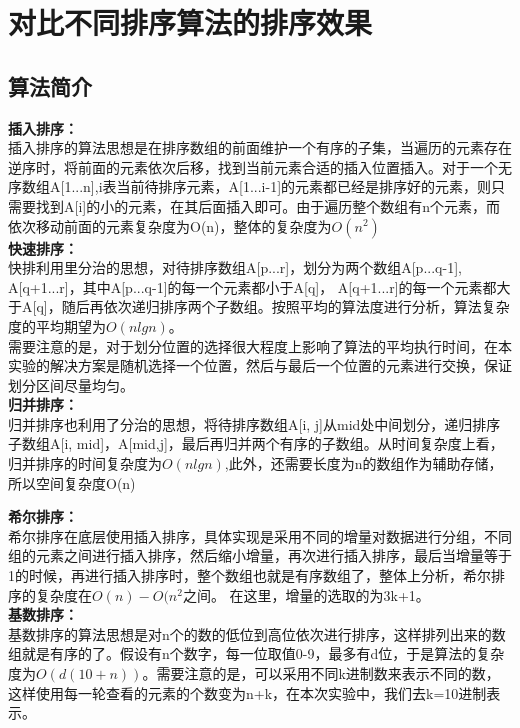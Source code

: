 \documentclass[UTF8]{ctexart}
\begin{document}

\section{对比不同排序算法的排序效果}

\subsection{算法简介}

\textbf{插入排序：}\\
插入排序的算法思想是在排序数组的前面维护一个有序的子集，当遍历的元素存在逆序时，将前面的元素依次后移，找到当前元素合适的插入位置插入。对于一个无序数组A[1...n],i表当前待排序元素，A[1...i-1]的元素都已经是排序好的元素，则只需要找到A[i]的小的元素，在其后面插入即可。由于遍历整个数组有n个元素，而依次移动前面的元素复杂度为O(n)，整体的复杂度为$O(n^2)$\\

\textbf{快速排序：}\\
快排利用里分治的思想，对待排序数组A[p...r]，划分为两个数组A[p...q-1], A[q+1...r]，其中A[p...q-1]的每一个元素都小于A[q]， A[q+1...r]的每一个元素都大于A[q]，随后再依次递归排序两个子数组。按照平均的算法度进行分析，算法复杂度的平均期望为$O(nlgn)$。\\
需要注意的是，对于划分位置的选择很大程度上影响了算法的平均执行时间，在本实验的解决方案是随机选择一个位置，然后与最后一个位置的元素进行交换，保证划分区间尽量均匀。\\

\textbf{归并排序：}\\
归并排序也利用了分治的思想，将待排序数组A[i, j]从mid处中间划分，递归排序子数组A[i, mid]，A[mid,j]，最后再归并两个有序的子数组。从时间复杂度上看，归并排序的时间复杂度为$O(nlgn)$,此外，还需要长度为n的数组作为辅助存储，所以空间复杂度O(n)

\textbf{希尔排序：}\\
希尔排序在底层使用插入排序，具体实现是采用不同的增量对数据进行分组，不同组的元素之间进行插入排序，然后缩小增量，再次进行插入排序，最后当增量等于1的时候，再进行插入排序时，整个数组也就是有序数组了，整体上分析，希尔排序的复杂度在$O(n)-O(n^2$之间。
在这里，增量的选取的为3k+1。\\

\textbf{基数排序：}\\
基数排序的算法思想是对n个的数的低位到高位依次进行排序，这样排列出来的数组就是有序的了。假设有n个数字，每一位取值0-9，最多有d位，于是算法的复杂度为$O(d(10+n))$。需要注意的是，可以采用不同k进制数来表示不同的数，这样使用每一轮查看的元素的个数变为n+k，在本次实验中，我们去k=10进制表示。
\end{document}
